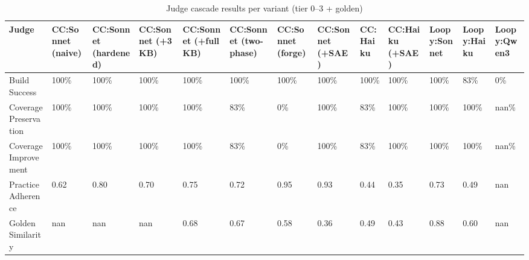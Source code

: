 \begin{table}[t]
\centering
\caption{Judge cascade results per variant (tier 0--3 + golden)}
\label{tab:judge-cascade}
\small
\begin{tabular}{lllllllllllll}
\toprule
 Judge                 & CC:Sonnet (naive)   & CC:Sonnet (hardened)   & CC:Sonnet (+3 KB)   & CC:Sonnet (+full KB)   & CC:Sonnet (two-phase)   & CC:Sonnet (forge)   & CC:Sonnet (+SAE)   & CC:Haiku   & CC:Haiku (+SAE)   & Loopy:Sonnet   & Loopy:Haiku   & Loopy:Qwen3   \\
\midrule
 Build Success         & 100\%               & 100\%                  & 100\%               & 100\%                  & 100\%                   & 100\%               & 100\%              & 100\%      & 100\%             & 100\%          & 83\%          & 0\%           \\
 Coverage Preservation & 100\%               & 100\%                  & 100\%               & 100\%                  & 83\%                    & 0\%                 & 100\%              & 83\%       & 100\%             & 100\%          & 100\%         & nan\%         \\
 Coverage Improvement  & 100\%               & 100\%                  & 100\%               & 100\%                  & 83\%                    & 0\%                 & 100\%              & 83\%       & 100\%             & 100\%          & 100\%         & nan\%         \\
 Practice Adherence    & 0.62                & 0.80                   & 0.70                & 0.75                   & 0.72                    & 0.95                & 0.93               & 0.44       & 0.35              & 0.73           & 0.49          & nan           \\
 Golden Similarity     & nan                 & nan                    & nan                 & 0.68                   & 0.67                    & 0.58                & 0.36               & 0.49       & 0.43              & 0.88           & 0.60          & nan           \\
\bottomrule
\end{tabular}
\end{table}
